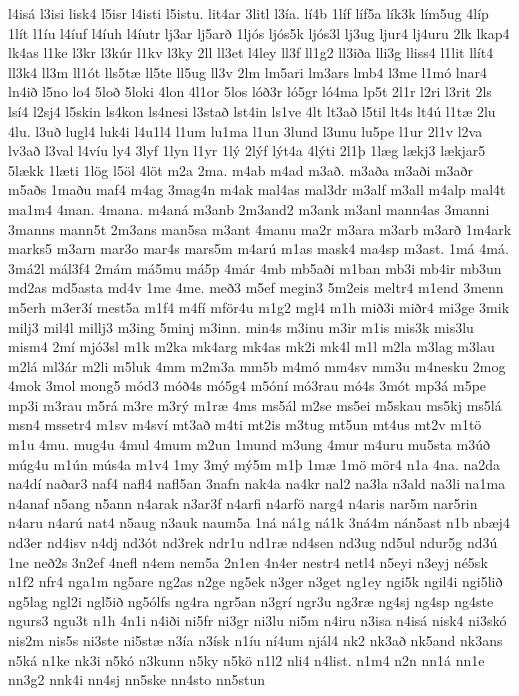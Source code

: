 {l4isá
l3isi
lisk4
l5isr
l4isti
l5istu.
lit4ar
3litl
l3ía.
lí4b
1líf
líf5a
lík3k
lím5ug
4líp
1lít
l1íu
l4íuf
l4íuh
l4íutr
lj3ar
lj5arð
1ljós
ljós5k
ljós3l
lj3ug
ljur4
lj4uru
2lk
lkap4
lk4as
l1ke
l3kr
l3kúr
l1kv
l3ky
2ll
ll3et
l4ley
ll3f
ll1g2
ll3iða
lli3g
lliss4
l1lit
llít4
ll3k4
ll3m
ll1ót
lls5tæ
ll5te
ll5ug
ll3v
2lm
lm5ari
lm3ars
lmb4
l3me
l1mó
lnar4
ln4ið
l5no
lo4
5loð
5loki
4lon
4l1or
5los
lóð3r
ló5gr
ló4ma
lp5t
2l1r
l2ri
l3rit
2ls
lsí4
l2sj4
l5skin
ls4kon
ls4nesi
l3stað
lst4in
ls1ve
4lt
lt3að
l5til
lt4s
lt4ú
l1tæ
2lu
4lu.
l3uð
lugl4
luk4i
l4u1l4
l1um
lu1ma
l1un
3lund
l3unu
lu5pe
l1ur
2l1v
l2va
lv3að
l3val
l4víu
ly4
3lyf
1lyn
l1yr
1lý
2lýf
lýt4a
4lýti
2l1þ
1læg
lækj3
lækjar5
5lækk
1læti
1lög
l5öl
4löt
m2a
2ma.
m4ab
m4ad
m3að.
m3aða
m3aði
m3aðr
m5aðs
1maðu
maf4
m4ag
3mag4n
m4ak
mal4as
mal3dr
m3alf
m3all
m4alp
mal4t
ma1m4
4man.
4mana.
m4aná
m3anb
2m3and2
m3ank
m3anl
mann4as
3manni
3manns
mann5t
2m3ans
man5sa
m3ant
4manu
ma2r
m3ara
m3arb
m3arð
1m4ark
marks5
m3arn
mar3o
mar4s
mars5m
m4arú
m1as
mask4
ma4sp
m3ast.
1má
4má.
3má2l
mál3f4
2mám
má5mu
má5p
4már
4mb
mb5aði
m1ban
mb3i
mb4ir
mb3un
md2as
md5asta
md4v
1me
4me.
með3
m5ef
megin3
5m2eis
meltr4
m1end
3menn
m5erh
m3er3í
mest5a
m1f4
m4fí
mför4u
m1g2
mgl4
m1h
mið3i
miðr4
mi3ge
3mik
milj3
mil4l
millj3
m3ing
5minj
m3inn.
min4s
m3inu
m3ir
m1is
mis3k
mis3lu
mism4
2mí
mjó3sl
m1k
m2ka
mk4arg
mk4as
mk2i
mk4l
m1l
m2la
m3lag
m3lau
m2lá
ml3ár
m2li
m5luk
4mm
m2m3a
mm5b
m4mó
mm4sv
mm3u
m4nesku
2mog
4mok
3mol
mong5
mód3
móð4s
mó5g4
m5óní
mó3rau
mó4s
3mót
mp3á
m5pe
mp3i
m3rau
m5rá
m3re
m3rý
m1ræ
4ms
ms5ál
m2se
ms5ei
m5skau
ms5kj
ms5lá
msn4
mssetr4
m1sv
m4sví
mt3að
m4ti
mt2is
m3tug
mt5un
mt4us
mt2v
m1tö
m1u
4mu.
mug4u
4mul
4mum
m2un
1mund
m3ung
4mur
m4uru
mu5sta
m3úð
múg4u
m1ún
mús4a
m1v4
1my
3mý
mý5m
m1þ
1mæ
1mö
mör4
n1a
4na.
na2da
na4dí
naðar3
naf4
nafl4
nafl5an
3nafn
nak4a
na4kr
nal2
na3la
n3ald
na3li
na1ma
n4anaf
n5ang
n5ann
n4arak
n3ar3f
n4arfi
n4arfö
narg4
n4aris
nar5m
nar5rin
n4aru
n4arú
nat4
n5aug
n3auk
naum5a
1ná
ná1g
ná1k
3ná4m
nán5ast
n1b
nbæj4
nd3er
nd4isv
n4dj
nd3ót
nd3rek
ndr1u
nd1ræ
nd4sen
nd3ug
nd5ul
ndur5g
nd3ú
1ne
neð2s
3n2ef
4nefl
n4em
nem5a
2n1en
4n4er
nestr4
netl4
n5eyi
n3eyj
né5sk
n1f2
nfr4
nga1m
ng5are
ng2as
n2ge
ng5ek
n3ger
n3get
ng1ey
ngi5k
ngil4i
ngi5lið
ng5lag
ngl2i
ngl5ið
ng5ólfs
ng4ra
ngr5an
n3grí
ngr3u
ng3ræ
ng4sj
ng4sp
ng4ste
ngurs3
ngu3t
n1h
4n1i
n4iði
ni5fr
ni3gr
ni3lu
ni5m
n4iru
n3isa
n4isá
nisk4
ni3skó
nis2m
nis5s
ni3ste
ni5stæ
n3ía
n3ísk
n1íu
ní4um
njál4
nk2
nk3að
nk5and
nk3ans
n5ká
n1ke
nk3i
n5kó
n3kunn
n5ky
n5kö
n1l2
nli4
n4list.
n1m4
n2n
nn1á
nn1e
nn3g2
nnk4i
nn4sj
nn5ske
nn4sto
nn5stun
}
